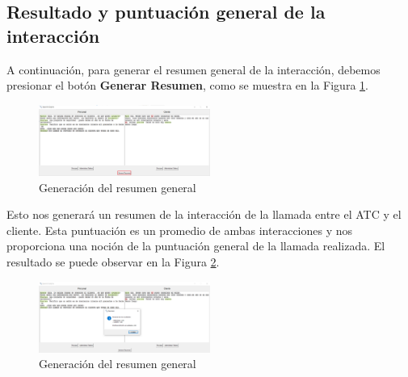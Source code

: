 \documentclass[twocolumn, fontsize=10pt]{article}
\begin{document}
\subsection{Resultado y puntuación general de la interacción}
A continuación, para generar el resumen general de la interacción, debemos presionar el botón \textbf{Generar Resumen}, como se muestra en la Figura \ref{fig:graf_resumen_general}.

\begin{figure}[h]
    \centering
    \includegraphics[width=0.5\textwidth]{graficas/resumen_general.png}
    \caption{Generación del resumen general}
    \label{fig:graf_resumen_general}
\end{figure}

Esto nos generará un resumen de la interacción de la llamada entre el ATC y el cliente. Esta puntuación es un promedio de ambas interacciones y nos proporciona una noción de la puntuación general de la llamada realizada. El resultado se puede observar en la Figura \ref{fig:graf_resultado_general}.

\begin{figure}[h]
    \centering
    \includegraphics[width=0.5\textwidth]{graficas/resultado_general.png}
    \caption{Generación del resumen general}
    \label{fig:graf_resultado_general}
\end{figure}


\begin{thebibliography}{}
\end{thebibliography}
\end{document}
